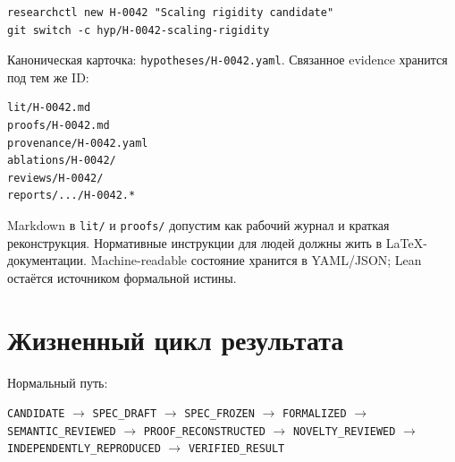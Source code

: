 \documentclass[11pt,a4paper]{article}
\newcommand{\status}[1]{\texttt{#1}}
\begin{document}
\begin{lstlisting}
researchctl new H-0042 "Scaling rigidity candidate"
git switch -c hyp/H-0042-scaling-rigidity
\end{lstlisting}

Каноническая карточка: \texttt{hypotheses/H-0042.yaml}. Связанное evidence хранится под тем же ID:

\begin{lstlisting}
lit/H-0042.md
proofs/H-0042.md
provenance/H-0042.yaml
ablations/H-0042/
reviews/H-0042/
reports/.../H-0042.*
\end{lstlisting}

\begin{warningbox}
Markdown в \texttt{lit/} и \texttt{proofs/} допустим как рабочий журнал и краткая реконструкция. Нормативные инструкции для людей должны жить в LaTeX-документации. Machine-readable состояние хранится в YAML/JSON; Lean остаётся источником формальной истины.
\end{warningbox}

\section{Жизненный цикл результата}

Нормальный путь:

\begin{center}
\status{CANDIDATE} $\rightarrow$ \status{SPEC\_DRAFT} $\rightarrow$ \status{SPEC\_FROZEN} $\rightarrow$ \status{FORMALIZED} $\rightarrow$ \status{SEMANTIC\_REVIEWED} $\rightarrow$ \status{PROOF\_RECONSTRUCTED} $\rightarrow$ \status{NOVELTY\_REVIEWED} $\rightarrow$ \status{INDEPENDENTLY\_REPRODUCED} $\rightarrow$ \status{VERIFIED\_RESULT}
\end{center}
\end{document}

